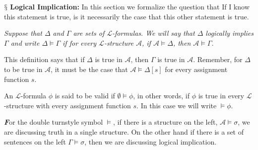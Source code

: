 \documentclass[10pt,a4paper]{article}
\newenvironment{callout}
	{\begin{calloutbox}\color{charcoal}\textbf\textit}
	{\end{calloutbox}}
\newcommand{\newpoint}[1]{\indent$\mathsection$ \textbf{#1}}
\newcommand{\curveL}{\mathcal{L}}
\newcommand{\curveA}{\mathcal{A}}
\begin{document}
                    \newpoint{Logical Implication: } In this section we formalize the question that If I know this statement is true, is it necessarily the case that this other statement is true.
                    \begin{define}
                        \textit{Suppose that $\Delta$ and $\Gamma$ are sets of $\curveL$-formulas. We will say that $\Delta$ logically implies $\Gamma$ and write $\Delta\vDash \Gamma$ if for every $\curveL$-structure $\curveA$, if $\curveA\vDash\Delta$, then $\curveA\vDash\Gamma$.}
                    \end{define}
                    This definition says that if $\Delta$ is true in $\curveA$, then $\Gamma$ is true in $\curveA$. Remember, for $\Delta$ to be true in $\curveA$, it must be the case that $\curveA\vDash\Delta[s]$ for every assignment function $s$.
                    \begin{define}
                        An $\curveL$-formula $\phi$ is said to be valid if $\emptyset\vDash\phi$, in other words, if $\phi$ is true in every $\curveL$-structure with every assignment function $s$. In this case we will write $\vDash\phi$.
                    \end{define}
                    \begin{callout}
                        For the double turnstyle symbol $\vDash$, if there is a structure on the left, $\curveA\vDash \sigma$, we are discussing truth in a single structure. On the other hand if there is a set of sentences on the left $\Gamma\vDash\sigma$, then we are discussing logical implication.
                    \end{callout}
\end{document}
